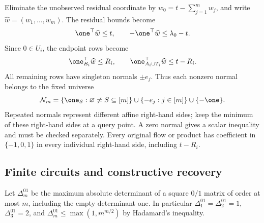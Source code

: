 Eliminate the unobserved residual coordinate by
$w_0=t-\sum_{j=1}^mw_j$, and write $\widehat w=(w_1,\ldots,w_m)$.
The residual bounds become
\begin{equation}\label{eq:chain-residual-reduced}
 \one^\top\widehat w\le t,\qquad
 -\one^\top\widehat w\le\lambda_0-t.
\end{equation}
Since $0\in U_i$, the endpoint rows become
\begin{equation}\label{eq:chain-endpoints-reduced}
 \one_{B_i}^\top\widehat w\le R_i,\qquad
 \one_{A_i\cup T_i}^\top\widehat w\le t-R_i.
\end{equation}
All remaining rows have singleton normals $\pm e_j$.
Thus each nonzero normal belongs to the fixed universe
\begin{equation}\label{eq:chain-normal-universe}
 \mathcal N_m=\{\one_S:\varnothing\ne S\subseteq[m]\}
                 \cup\{-e_j:j\in[m]\}\cup\{-\one\}.
\end{equation}
Repeated normals represent different affine right-hand sides; keep
the minimum of these right-hand sides at a query point. A zero
normal gives a scalar inequality and must be checked separately.
Every original flow or product has coefficient in $\{-1,0,1\}$
in every individual right-hand side, including $t-R_i$.

\subsection{Finite circuits and constructive recovery}

Let $\Delta^{01}_m$ be the maximum absolute determinant of a square
$0/1$ matrix of order at most $m$, including the empty determinant
one. In particular $\Delta^{01}_1=\Delta^{01}_2=1$, $\Delta^{01}_3=2$, and
$\Delta^{01}_m\le\max(1,m^{m/2})$ by Hadamard's inequality.

